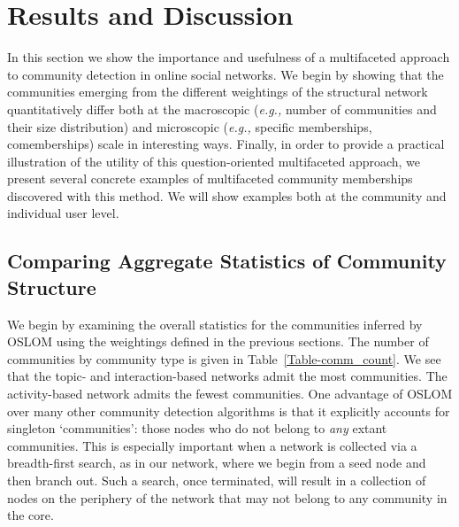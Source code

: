 \documentclass[10pt,letterpaper]{article}
\begin{document}

\section{Results and Discussion}
In this section we show the importance and usefulness of a multifaceted approach to community detection in online social networks. We begin by showing that the communities emerging from the different weightings of the structural network  quantitatively differ both at the macroscopic ({\it e.g.,} number of communities and their size distribution) and microscopic ({\it e.g.,} specific memberships, comemberships) scale in interesting ways. Finally, in order to provide a practical illustration of the utility of this question-oriented multifaceted approach, we present several concrete examples of multifaceted community memberships discovered with this method. We will show examples both at the community and individual user level.


\subsection{Comparing Aggregate Statistics of Community Structure}

We begin by examining the overall statistics for the communities inferred by OSLOM using the weightings defined in the previous sections. The number of communities by community type is given in Table~\ref{Table-comm_count}. We see that the topic- and interaction-based networks admit the most communities. The activity-based network admits the fewest communities.  One advantage of OSLOM over many other community detection algorithms is that it explicitly accounts for singleton `communities': those nodes who do not belong to \emph{any} extant communities. This is especially important when a network is collected via a breadth-first search, as in our network, where we begin from a seed node and then branch out. Such a search, once terminated, will result in a collection of nodes on the periphery of the network that may not belong to any community in the core.

\end{document}
